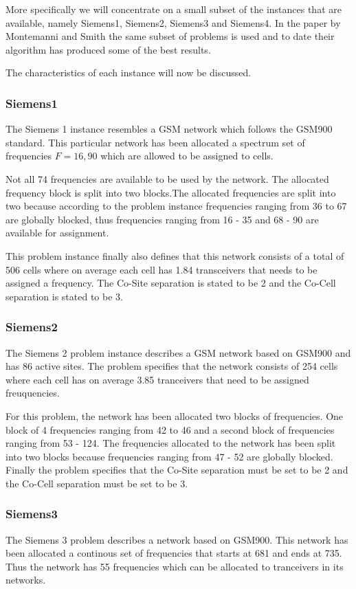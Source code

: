 More specifically we will concentrate on a small subset of the instances that are available, namely Siemens1, Siemens2, Siemens3 and Siemens4. In the paper by Montemanni and Smith \cite{TabuMontemanniSmith} the same subset of problems is used and to date their algorithm has produced some of the best results. %

The characteristics of each instance will now be discussed.
\subsubsection{Siemens1}
The Siemens 1 instance resembles a GSM network which follows the GSM900 standard. This particular network has been allocated a spectrum set of frequencies $F = {16,90}$ which are allowed to be assigned to cells. 

Not all 74 frequencies are available to be used by the network. The allocated frequency block is split into two blocks.The allocated frequencies are split into two because according to the problem instance frequencies ranging from 36 to 67 are globally blocked, thus frequencies ranging from 16  - 35 and 68 - 90 are available for assignment.

This problem instance finally also defines that this network consists of a total of 506 cells where on average each cell has 1.84 transceivers that needs to be assigned a frequency. The Co-Site separation is stated to be 2 and the Co-Cell separation is stated to be 3.
\subsubsection{Siemens2}
The Siemens 2 problem instance describes a GSM network based on GSM900 and has 86 active sites. The problem specifies that the network consists of 254 cells where each cell has on average 3.85 tranceivers that need to be assigned freuquencies.

For this problem, the network has been allocated two blocks of frequencies. One block of 4 frequencies ranging from 42 to 46 and a second block of frequencies ranging from 53 - 124. The frequencies allocated to the network has been split into two blocks because frequencies ranging from 47 - 52 are globally blocked. Finally the problem specifies that the Co-Site separation must be set to be 2 and the Co-Cell separation must be set to be 3.
\subsubsection{Siemens3}
The Siemens 3 problem describes a network based on GSM900. This network has been allocated a continous set of frequencies that starts at 681 and ends at 735. Thus the network has 55 frequencies which can be allocated to tranceivers in its networks.

